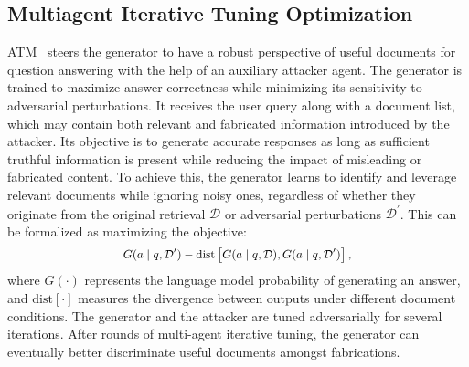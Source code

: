 \subsection{Multiagent Iterative Tuning Optimization}
ATM~\cite{zhu-etal-2024-atm} steers the generator to have a robust perspective of useful documents for question answering with the help of an auxiliary attacker agent. The generator is trained to maximize answer correctness while minimizing its sensitivity to adversarial perturbations. It receives the user query along with a document list, which may contain both relevant and fabricated information introduced by the attacker. Its objective is to generate accurate responses as long as sufficient truthful information is present while reducing the impact of misleading or fabricated content. To achieve this, the generator learns to identify and leverage relevant documents while ignoring noisy ones, regardless of whether they originate from the original retrieval $\mathcal{D}$ or adversarial perturbations $\mathcal{D}^{\prime}$. This can be formalized as maximizing the objective:
\begin{equation}
\small
\setlength\abovedisplayskip{0.2cm}
\setlength\belowdisplayskip{0.2cm}
\begin{aligned}
G(a\mid q,\mathcal{D}^{\prime}) - \mathrm{dist}\left[G(a\mid q, \mathcal{D}), G(a\mid q,\mathcal{D}^{\prime})\right],
\end{aligned}
\end{equation}
where ${G}(\cdot)$ represents the language model probability of generating an answer, and $\mathrm{dist}\left[\cdot\right]$ measures the divergence between outputs under different document conditions. The generator and the attacker are tuned adversarially for several iterations. After rounds of multi-agent iterative tuning, the generator can eventually better discriminate useful documents amongst fabrications.

